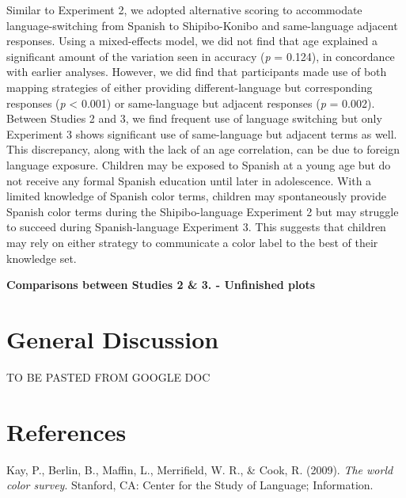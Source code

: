 \documentclass[,man,floatsintext]{apa6}
\theoremstyle{definition}
\theoremstyle{definition}
\theoremstyle{definition}
\theoremstyle{remark}
\begin{document}
Similar to Experiment 2, we adopted alternative scoring to accommodate
language-switching from Spanish to Shipibo-Konibo and same-language
adjacent responses. Using a mixed-effects model, we did not find that
age explained a significant amount of the variation seen in accuracy
(\emph{p} = 0.124), in concordance with earlier analyses. However, we
did find that participants made use of both mapping strategies of either
providing different-language but corresponding responses (\emph{p}
\textless{} 0.001) or same-language but adjacent responses (\emph{p} =
0.002). Between Studies 2 and 3, we find frequent use of language
switching but only Experiment 3 shows significant use of same-language
but adjacent terms as well. This discrepancy, along with the lack of an
age correlation, can be due to foreign language exposure. Children may
be exposed to Spanish at a young age but do not receive any formal
Spanish education until later in adolescence. With a limited knowledge
of Spanish color terms, children may spontaneously provide Spanish color
terms during the Shipibo-language Experiment 2 but may struggle to
succeed during Spanish-language Experiment 3. This suggests that
children may rely on either strategy to communicate a color label to the
best of their knowledge set.

\textbf{Comparisons between Studies 2 \& 3. - Unfinished plots}

\section{General Discussion}\label{general-discussion}

TO BE PASTED FROM GOOGLE DOC

\newpage

\section{References}\label{references}

\begingroup
\setlength{\parindent}{-0.5in} \setlength{\leftskip}{0.5in}

\hypertarget{refs}{}
\hypertarget{ref-berlin2009}{}
Kay, P., Berlin, B., Maffin, L., Merrifield, W. R., \& Cook, R. (2009).
\emph{The world color survey}. Stanford, CA: Center for the Study of
Language; Information.

\endgroup
\end{document}
